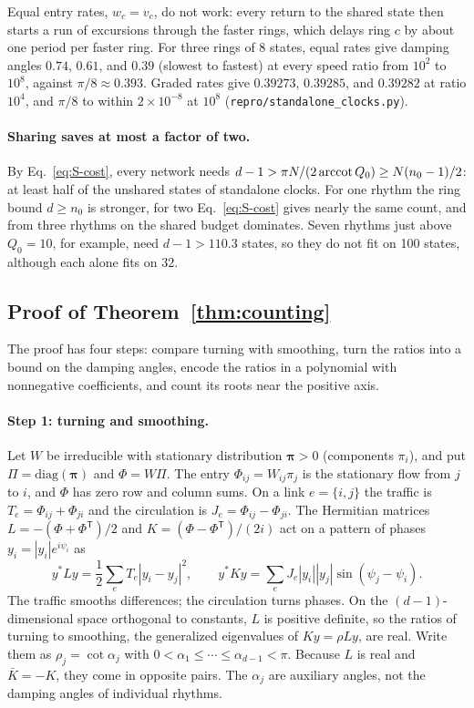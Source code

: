 Equal entry rates, $w_c=v_c$, do not work: every return to the shared state then starts a run of excursions through the faster rings, which delays ring $c$ by about one period per faster ring. For three rings of 8 states, equal rates give damping angles $0.74$, $0.61$, and $0.39$ (slowest to fastest) at every speed ratio from $10^2$ to $10^8$, against $\pi/8\approx0.393$. Graded rates give $0.39273$, $0.39285$, and $0.39282$ at ratio $10^4$, and $\pi/8$ to within $2\times10^{-8}$ at $10^8$ (\texttt{repro/standalone\_clocks.py}).

\paragraph*{Sharing saves at most a factor of two.} By Eq.~\eqref{eq:S-cost}, every network needs $d-1>\pi N/(2\operatorname{arccot} Q_0)\ge N(n_0-1)/2$: at least half of the unshared states of standalone clocks. For one rhythm the ring bound $d\ge n_0$ is stronger, for two Eq.~\eqref{eq:S-cost} gives nearly the same count, and from three rhythms on the shared budget dominates. Seven rhythms just above $Q_0=10$, for example, need $d-1>110.3$ states, so they do not fit on 100 states, although each alone fits on 32.

\subsection{Proof of Theorem~\ref{thm:counting}}

The proof has four steps: compare turning with smoothing, turn the ratios into a bound on the damping angles, encode the ratios in a polynomial with nonnegative coefficients, and count its roots near the positive axis.

\paragraph*{Step 1: turning and smoothing.} Let $W$ be irreducible with stationary distribution $\bm\pi>0$ (components $\pi_i$), and put $\Pi=\mathrm{diag}(\bm\pi)$ and $\Phi=W\Pi$. The entry $\Phi_{ij}=W_{ij}\pi_j$ is the stationary flow from $j$ to $i$, and $\Phi$ has zero row and column sums. On a link $e=\{i,j\}$ the traffic is $T_e=\Phi_{ij}+\Phi_{ji}$ and the circulation is $J_e=\Phi_{ij}-\Phi_{ji}$. The Hermitian matrices $L=-(\Phi+\Phi^{\mathsf T})/2$ and $K=(\Phi-\Phi^{\mathsf T})/(2i)$ act on a pattern of phases $y_i=|y_i|e^{i\psi_i}$ as
\begin{equation}
y^*Ly=\frac12\sum_eT_e|y_i-y_j|^2,\qquad y^*Ky=\sum_eJ_e|y_i||y_j|\sin(\psi_j-\psi_i).
\label{eq:S-forms}
\end{equation}
The traffic smooths differences; the circulation turns phases. On the $(d-1)$-dimensional space orthogonal to constants, $L$ is positive definite, so the ratios of turning to smoothing, the generalized eigenvalues of $Ky=\rho Ly$, are real. Write them as $\rho_j=\cot\alpha_j$ with $0<\alpha_1\le\cdots\le\alpha_{d-1}<\pi$. Because $L$ is real and $\bar K=-K$, they come in opposite pairs. The $\alpha_j$ are auxiliary angles, not the damping angles of individual rhythms.

